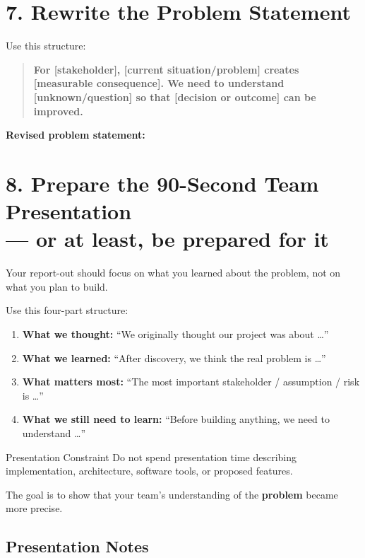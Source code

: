 \documentclass[11pt]{article}
\newcommand{\writearea}[1]{%
\vspace{0.2em}
\fbox{\parbox[t][#1][t]{0.97\textwidth}{\vspace{0.3em}}}
}
\begin{document}
\section*{7. Rewrite the Problem Statement}

Use this structure:

\begin{quote}
\textbf{For [stakeholder], [current situation/problem] creates [measurable consequence]. We need to understand [unknown/question] so that [decision or outcome] can be improved.}
\end{quote}

\textbf{Revised problem statement:}

\writearea{1.2in}

\section*{8. Prepare the 90-Second Team Presentation\\--- or at least, be prepared for it}

Your report-out should focus on what you learned about the problem, not on what you plan to build.

Use this four-part structure:

\begin{enumerate}[leftmargin=*]
    \item \textbf{What we thought:} ``We originally thought our project was about \ldots''
    \item \textbf{What we learned:} ``After discovery, we think the real problem is \ldots''
    \item \textbf{What matters most:} ``The most important stakeholder / assumption / risk is \ldots''
    \item \textbf{What we still need to learn:} ``Before building anything, we need to understand \ldots''
\end{enumerate}

\begin{activitybox}{Presentation Constraint}
Do not spend presentation time describing implementation, architecture, software tools, or proposed features.

The goal is to show that your team's understanding of the \textbf{problem} became more precise.
\end{activitybox}

\subsection*{Presentation Notes}
\end{document}
